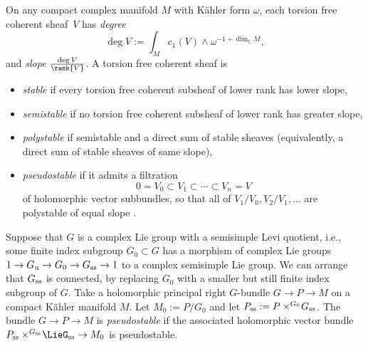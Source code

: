 \documentclass[pdftex]{sigma}
\numberwithin{equation}{section}
\renewcommand{\C}{\mathbb{C}}
\newcommand{\amal}[3]{\ensuremath{{#1} \mathbin{\times^{#2}} \! #3}}
\newcommand*{\dimC}[1]{\ensuremath{\dim_{\C} \! #1}}
\begin{document}
On any compact complex manifold $M$ with K\"ahler form $\omega$, each torsion free coherent sheaf~$V$
has \emph{degree} \cite[p.~168]{Kobayashi:1987}
\[
\deg{V} := \int_M c_1(V) \wedge \omega^{-1 + \dimC{M}},
\]
and \emph{slope} $\frac{\deg{V}}{\rank{V}}$. A torsion free coherent sheaf is
\begin{itemize}\itemsep=0pt
\item
\emph{stable} if every torsion free coherent subsheaf of lower rank has lower slope,
\item
\emph{semistable} if no torsion free coherent subsheaf of lower rank has greater slope,
\item
\emph{polystable} if semistable and a direct sum of stable sheaves (equivalently, a direct sum of
stable sheaves of same slope),
\item
\emph{pseudostable} if it admits a filtration
\[0 = V_0 \subset V_1 \subset \cdots \subset V_n = V\] of holomorphic vector
subbundles, so that all of $V_1/V_0, V_2/V_1, \dots$ are polystable of equal slope \cite[p. 168]{Kobayashi:1987}.
\end{itemize}
Suppose that $G$ is a complex Lie group with a semisimple Levi quotient, i.e., some finite index
subgroup $G_0 \subset G$ has a morphism of complex Lie groups
$1 \to G_{\rm u} \to G_0 \to G_{\rm ss} \to 1$ to a complex semisimple Lie group.
We can arrange that $G_{\rm ss}$ is connected, by replacing $G_0$ with a smaller but still finite index
subgroup of $G$.
Take a holomorphic principal right $G$-bundle $G \to P \to M$ on a compact K\"ahler manifold $M$.
Let $M_0 := P/G_0$ and let $P_{\rm ss} := \amal{P}{G_0}{G_{\rm ss}}$.
The bundle $G \to P \to M$ is \emph{pseudostable} if the associated holomorphic
vector bundle $\amal{P_{\rm ss}}{G_{\rm ss}}{\LieG_{\rm ss}} \to M_0$ is pseudostable.
\end{document}
